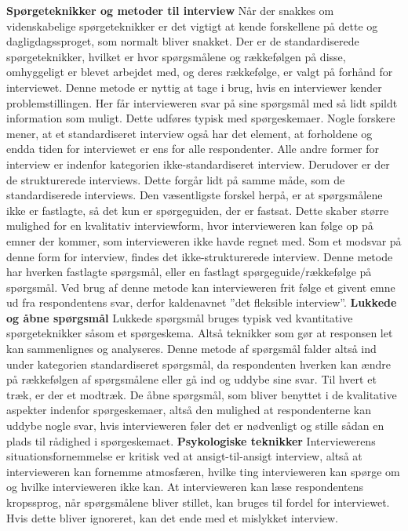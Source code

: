 \textbf{Spørgeteknikker og metoder til interview}
Når der snakkes om videnskabelige spørgeteknikker er det vigtigt at kende forskellene på dette og dagligdagssproget, som normalt bliver snakket. Der er de standardiserede spørgeteknikker, hvilket er hvor spørgsmålene og rækkefølgen på disse, omhyggeligt er blevet arbejdet med, og deres rækkefølge, er valgt på forhånd for interviewet. Denne metode er nyttig at tage i brug, hvis en interviewer kender problemstillingen. Her får intervieweren svar på sine spørgsmål med så lidt spildt information som muligt. Dette udføres typisk med spørgeskemaer. Nogle forskere mener, at et standardiseret interview også har det element, at forholdene og endda tiden for interviewet er ens for alle respondenter. Alle andre former for interview er indenfor kategorien ikke-standardiseret interview.
Derudover er der de strukturerede interviews. Dette forgår lidt på samme måde, som de standardiserede interviews. Den væsentligste forskel herpå, er at spørgsmålene ikke er fastlagte, så det kun er spørgeguiden, der er fastsat. Dette skaber større mulighed for en kvalitativ interviewform, hvor intervieweren kan følge op på emner der kommer, som intervieweren ikke havde regnet med. Som et modsvar på denne form for interview, findes det ikke-strukturerede interview. Denne metode har hverken fastlagte spørgsmål, eller en fastlagt spørgeguide/rækkefølge på spørgsmål. Ved brug af denne metode kan intervieweren frit følge et givent emne ud fra respondentens svar, derfor kaldenavnet  ”det fleksible interview”. 
\textbf{Lukkede og åbne spørgsmål}
Lukkede spørgsmål bruges typisk ved kvantitative spørgeteknikker såsom et spørgeskema. Altså teknikker som gør at responsen let kan sammenlignes og analyseres. Denne metode af spørgsmål falder altså ind under kategorien standardiseret spørgsmål, da respondenten hverken kan ændre på rækkefølgen af spørgsmålene eller gå ind og uddybe sine svar. 
Til hvert et træk, er der et modtræk. De åbne spørgsmål, som bliver benyttet i de kvalitative aspekter indenfor spørgeskemaer, altså den mulighed at respondenterne kan uddybe nogle svar, hvis intervieweren føler det er nødvenligt og stille sådan en plads til rådighed i spørgeskemaet.
\textbf{Psykologiske teknikker}
Interviewerens situationsfornemmelse er kritisk ved at ansigt-til-ansigt interview, altså at intervieweren kan fornemme atmosfæren, hvilke ting intervieweren kan spørge om og hvilke intervieweren ikke kan. At intervieweren kan læse respondentens kropssprog, når spørgsmålene bliver stillet, kan bruges til fordel for interviewet. Hvis dette bliver ignoreret, kan det ende med et mislykket interview.
